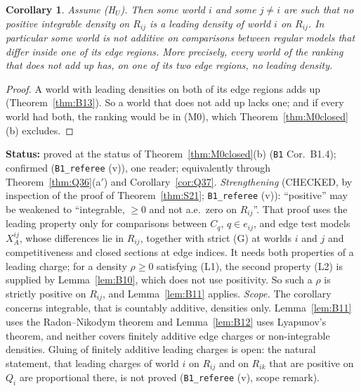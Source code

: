 \documentclass[11pt]{article}
\newtheorem{corollary}[theorem]{Corollary}
\theoremstyle{definition}
\theoremstyle{remark}
\newcommand{\src}[1]{\texttt{#1}}
\newcommand{\status}[1]{\par\smallskip\noindent\textbf{Status:} #1\par\smallskip}
\begin{document}
\begin{corollary}\label{cor:B14}
Assume (H$_U$). Then some world $i$ and some $j\ne i$ are such that no positive integrable density on $R_{ij}$ is a leading density of world $i$ on $R_{ij}$. In particular some world is not additive on comparisons between regular models that differ inside one of its edge regions. More precisely, every world of the ranking that does not add up has, on one of its two edge regions, no leading density.
\end{corollary}
\begin{proof}
A world with leading densities on both of its edge regions adds up (Theorem~\ref{thm:B13}). So a world that does not add up lacks one; and if every world had both, the ranking would be in (M0), which Theorem~\ref{thm:M0closed}(b) excludes.
\end{proof}
\status{proved at the status of Theorem~\ref{thm:M0closed}(b) (\src{B1} Cor.~B1.4); confirmed (\src{B1\_referee} (v)), one reader; equivalently through Theorem~\ref{thm:Q36}(a$'$) and Corollary~\ref{cor:Q37}. \emph{Strengthening} (CHECKED, by inspection of the proof of Theorem~\ref{thm:S21}; \src{B1\_referee} (v)): ``positive'' may be weakened to ``integrable, $\ge0$ and not a.e.\ zero on $R_{ij}$''. That proof uses the leading property only for comparisons between $C_q$, $q\in e_{ij}$, and edge test models $X^{ij}_A$, whose differences lie in $R_{ij}$, together with strict (G) at worlds $i$ and $j$ and competitiveness and closed sections at edge indices. It needs both properties of a leading charge; for a density $\rho\ge0$ satisfying (L1), the second property (L2) is supplied by Lemma~\ref{lem:B10}, which does not use positivity. So such a $\rho$ is strictly positive on $R_{ij}$, and Lemma~\ref{lem:B11} applies. \emph{Scope.} The corollary concerns integrable, that is countably additive, densities only. Lemma~\ref{lem:B11} uses the Radon--Nikodym theorem and Lemma~\ref{lem:B12} uses Lyapunov's theorem, and neither covers finitely additive edge charges or non-integrable densities. Gluing of finitely additive leading charges is open: the natural statement, that leading charges of world $i$ on $R_{ij}$ and on $R_{ik}$ that are positive on $Q_i$ are proportional there, is not proved (\src{B1\_referee} (v), scope remark).}
\end{document}
